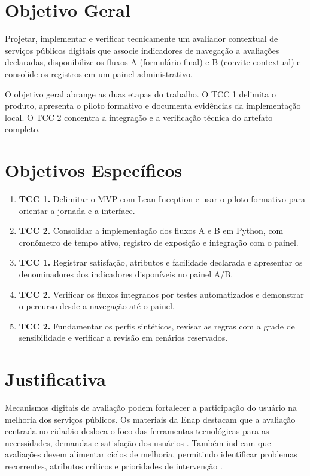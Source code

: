 \section{Objetivo Geral}
\label{sec:1.3}

Projetar, implementar e verificar tecnicamente um avaliador contextual de serviços públicos digitais que associe indicadores de navegação a avaliações declaradas, disponibilize os fluxos A (formulário final) e B (convite contextual) e consolide os registros em um painel administrativo.

O objetivo geral abrange as duas etapas do trabalho. O TCC 1 delimita o produto, apresenta o piloto formativo e documenta evidências da implementação local. O TCC 2 concentra a integração e a verificação técnica do artefato completo.

\section{Objetivos Específicos}
\label{sec:1.4}

\begin{enumerate}
\def\labelenumi{\arabic{enumi}.}

\item
  \textbf{TCC 1.} Delimitar o MVP com Lean Inception e usar o piloto formativo para orientar a jornada e a interface.
\item
  \textbf{TCC 2.} Consolidar a implementação dos fluxos A e B em Python, com cronômetro de tempo ativo, registro de exposição e integração com o painel.
\item
  \textbf{TCC 1.} Registrar satisfação, atributos e facilidade declarada e apresentar os denominadores dos indicadores disponíveis no painel A/B.
\item
  \textbf{TCC 2.} Verificar os fluxos integrados por testes automatizados e demonstrar o percurso desde a navegação até o painel.
\item
  \textbf{TCC 2.} Fundamentar os perfis sintéticos, revisar as regras com a grade de sensibilidade e verificar a revisão em cenários reservados.
\end{enumerate}

\section{Justificativa}
\label{sec:1.5}

Mecanismos digitais de avaliação podem fortalecer a participação do usuário na melhoria dos serviços públicos. Os materiais da Enap destacam que a avaliação centrada no cidadão desloca o foco das ferramentas tecnológicas para as necessidades, demandas e satisfação dos usuários \cite{lima2020m1}. Também indicam que avaliações devem alimentar ciclos de melhoria, permitindo identificar problemas recorrentes, atributos críticos e prioridades de intervenção \cite{lima2020m4}.

